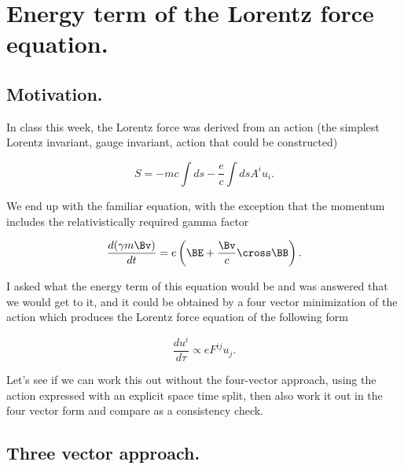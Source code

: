 
%

\chapter{Energy term of the Lorentz force equation.}
\label{chap:lorentzForceHamiltonian}
{}
\date{Feb 6, 2011}

\beginArtWithToc

\section{Motivation.}

In class this week, the Lorentz force was derived from an action (the simplest Lorentz invariant, gauge invariant, action that could be constructed)

\begin{equation}\label{eqn:lorentzForceHamiltonian:10}
S = - m c \int ds - \frac{e}{c} \int ds A^i u_i.
\end{equation}

We end up with the familiar equation, with the exception that the momentum includes the relativistically required gamma factor

\begin{equation}\label{eqn:lorentzForceHamiltonian:20}
\frac{d (\gamma m \Bv)}{dt} = e \left( \BE + \frac{\Bv}{c} \cross \BB \right).
\end{equation}

I asked what the energy term of this equation would be and was answered that we would get to it, and it could be obtained by a four vector minimization of the action which produces the Lorentz force equation of the following form

\begin{equation}\label{eqn:lorentzForceHamiltonian:30}
\frac{du^i}{d\tau} \propto e F^{ij} u_j.
\end{equation}

Let's see if we can work this out without the four-vector approach, using the action expressed with an explicit space time split, then also work it out in the four vector form and compare as a consistency check.

\section{Three vector approach.}
